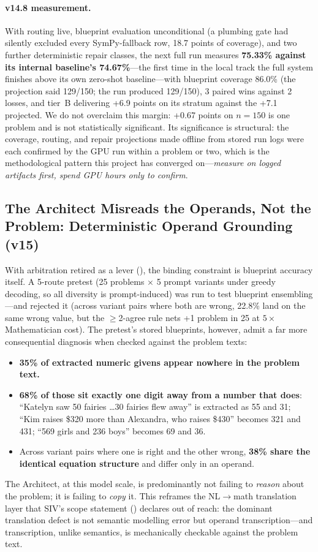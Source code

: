 \documentclass[11pt,a4paper]{article}
\begin{document}
\paragraph{v14.8 measurement.}
With routing live, blueprint evaluation unconditional (a plumbing gate had silently excluded every SymPy-fallback row, 18.7 points of coverage), and two further deterministic repair classes, the next full run measures \textbf{75.33\% against its internal baseline's 74.67\%}---the first time in the local track the full system finishes above its own zero-shot baseline---with blueprint coverage 86.0\% (the projection said 129/150; the run produced 129/150), 3 paired wins against 2 losses, and tier~B delivering +6.9 points on its stratum against the +7.1 projected.
We do not overclaim this margin: +0.67 points on $n{=}150$ is one problem and is not statistically significant.
Its significance is structural: the coverage, routing, and repair projections made offline from stored run logs were each confirmed by the GPU run within a problem or two, which is the methodological pattern this project has converged on---\emph{measure on logged artifacts first, spend GPU hours only to confirm}.

\subsection{The Architect Misreads the Operands, Not the Problem: Deterministic Operand Grounding (v15)}
\label{sec:v15_grounding}
With arbitration retired as a lever (), the binding constraint is blueprint accuracy itself.
A 5-route pretest (25 problems $\times$ 5 prompt variants under greedy decoding, so all diversity is prompt-induced) was run to test blueprint ensembling---and rejected it (across variant pairs where both are wrong, 22.8\% land on the same wrong value, but the $\geq$2-agree rule nets +1 problem in 25 at $5\times$ Mathematician cost).
The pretest's stored blueprints, however, admit a far more consequential diagnosis when checked against the problem texts:
\begin{itemize}[leftmargin=*,itemsep=2pt]
    \item \textbf{35\% of extracted numeric givens appear nowhere in the problem text.}
    \item \textbf{68\% of those sit exactly one digit away from a number that does}: ``Katelyn saw 50 fairies \ldots 30 fairies flew away'' is extracted as 55 and 31; ``Kim raises \$320 more than Alexandra, who raises \$430'' becomes 321 and 431; ``569 girls and 236 boys'' becomes 69 and 36.
    \item Across variant pairs where one is right and the other wrong, \textbf{38\% share the identical equation structure} and differ only in an operand.
\end{itemize}
The Architect, at this model scale, is predominantly not failing to \emph{reason} about the problem; it is failing to \emph{copy} it.
This reframes the NL$\to$math translation layer that SIV's scope statement () declares out of reach: the dominant translation defect is not semantic modelling error but operand transcription---and transcription, unlike semantics, is mechanically checkable against the problem text.
\end{document}
